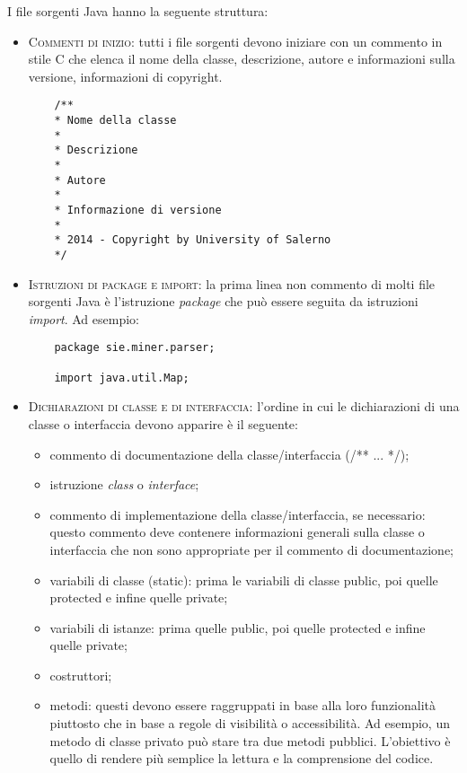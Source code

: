 I file sorgenti Java hanno la seguente struttura:
\begin{itemize}
  \item \textsc{Commenti di inizio:} tutti i file sorgenti devono iniziare con un commento in stile C che elenca il nome della classe, descrizione, autore e informazioni sulla versione, informazioni di copyright.
  \begin{lstlisting}
    /**
    * Nome della classe
    * 
    * Descrizione
    *
    * Autore
    *
    * Informazione di versione
    *
    * 2014 - Copyright by University of Salerno
    */
  \end{lstlisting}
  
  \item \textsc{Istruzioni di package e import:} la prima linea non commento di molti file sorgenti Java è l'istruzione \textit{package} che può essere seguita da istruzioni \textit{import}. Ad esempio:\\
  \begin{lstlisting}
    package sie.miner.parser;
    
    import java.util.Map;
  \end{lstlisting}

  \item \textsc{Dichiarazioni di classe e di interfaccia:} l'ordine in cui le dichiarazioni di una classe o interfaccia devono apparire è il seguente: 
\begin{itemize}
  \item commento di documentazione della classe/interfaccia (/** ... */);
  \item istruzione \textit{class} o \textit{interface};
  \item commento di implementazione della classe/interfaccia, se necessario: questo commento deve contenere informazioni generali sulla classe o interfaccia che non sono appropriate per il commento di documentazione;
  \item variabili di classe (static): prima le variabili di classe public, poi quelle protected e infine quelle private;
  \item variabili di istanze: prima quelle public, poi quelle protected e infine quelle private;
  \item costruttori;
  \item metodi: questi devono essere raggruppati in base alla loro funzionalità piuttosto che in base a regole di visibilità o accessibilità. Ad esempio, un metodo di classe privato può stare tra due metodi pubblici. L'obiettivo è quello di rendere più semplice la lettura e la comprensione del codice.
\end{itemize}  

\end{itemize}

